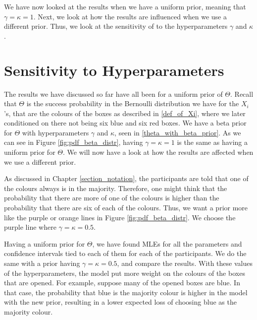 We have now looked at the results when we have a uniform prior, meaning that $\gamma=\kappa =1$. Next, we look at how the results are influenced when we use a different prior. Thus, we look at the sensitivity of to the hyperparameters $\gamma$ and $\kappa$.





\section{Sensitivity to Hyperparameters}
The results we have discussed so far have all been for a uniform prior of $\Theta$. 
Recall that $\Theta$ is the success probability in the Bernoulli distribution we have for the $X_i$'s, that are the colours of the boxes as described in \eqref{def_of_Xi}, where we later conditioned on there not being six blue and six red boxes. We have a beta prior for $\Theta$ with hyperparameters $\gamma$ and $\kappa$, seen in \eqref{theta_with_beta_prior}. As we can see in Figure \ref{fig:pdf_beta_distr}, having $\gamma=\kappa=1$ is the same as having a uniform prior for $\Theta$. We will now have a look at how the results are affected when we use a different prior. 

As discussed in Chapter \ref{section_notation}, the participants are told that one of the colours always is in the majority. Therefore, one might think that the probability that there are more of one of the colours is higher than the probability that there are six of each of the colours. Thus, we want a prior more like the purple or orange lines in Figure \ref{fig:pdf_beta_distr}. We choose the purple line where $\gamma=\kappa=0.5$.


Having a uniform prior for $\Theta$, we have found MLEs for all the parameters and confidence intervals tied to each of them for each of the participants. We do the same with a prior having $\gamma=\kappa=0.5$, and compare the results.
With these values of the hyperparameters, the model put more weight on the colours of the boxes that are opened. 
For example, suppose many of the opened boxes are blue. In that case, the probability that blue is the majority colour is higher in the model with the new prior, resulting in a lower expected loss of choosing blue as the majority colour. 

